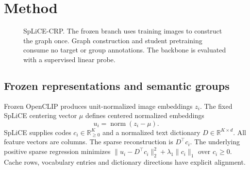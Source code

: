 \documentclass[11pt,a4paper]{article}
\begin{document}
\section{Method}
\begin{figure}[htbp]
\centering
{}
\caption{SpLiCE-CRP. The frozen branch uses training images to construct the
graph once. Graph construction and student pretraining consume no target or
group annotations. The backbone is evaluated with a supervised linear probe.}
\label{fig:architecture}
\end{figure}
\subsection{Frozen representations and semantic groups}
Frozen OpenCLIP produces unit-normalized image embeddings $z_i$. The fixed SpLiCE centering vector $\mu$
defines centered normalized embeddings
\begin{equation}
 u_i=\operatorname{norm}(z_i-\mu).
\end{equation}
SpLiCE supplies codes $c_i\in\mathbb{R}^{K}_{\geq0}$ and a normalized text dictionary
$D\in\mathbb{R}^{K\times d}$. All feature vectors are columns. The sparse
reconstruction is $D^\top c_i$. The underlying positive sparse regression
minimizes $\|u_i-D^\top c_i\|_2^2+\lambda_1\|c_i\|_1$ over $c_i\geq0$.
Cache rows, vocabulary entries and dictionary directions have explicit alignment.
\end{document}
